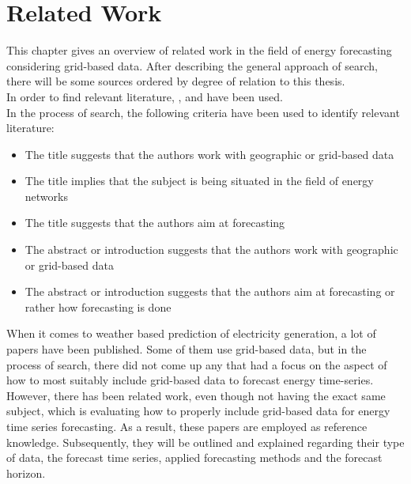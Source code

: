 \chapter{Related Work}
\label{ch:RW}

This chapter gives an overview of related work in the field of energy forecasting considering grid-based data. After describing the general approach of search, there will be some sources ordered by degree of relation to this thesis.\\

In order to find relevant literature, , and  have been used.\\
In the process of search, the following criteria have been used to identify relevant literature:
\begin{itemize}
  \item The title suggests that the authors work with geographic or grid-based data
  \item The title implies that the subject is being situated in the field of energy networks
  \item The title suggests that the authors aim at forecasting
  \item The abstract or introduction suggests that the authors work with geographic or grid-based data
  \item The abstract or introduction suggests that the authors aim at forecasting or rather how forecasting is done
\end{itemize}

When it comes to weather based prediction of electricity generation, a lot of papers have been published. Some of them use grid-based data, but in the process of search, there did not come up any that had a focus on the aspect of how to most suitably include grid-based data to forecast energy time-series. However, there has been related work, even though not having the exact same subject, which is evaluating how to properly include grid-based data for energy time series forecasting. As a result, these papers are employed as reference knowledge. Subsequently, they will be outlined and explained regarding their type of data, the forecast time series, applied forecasting methods and the forecast horizon.\\

